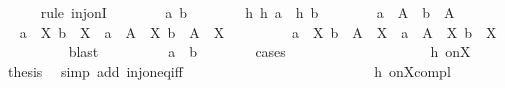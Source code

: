\begin{isabellebody}
\ \ \ \ \isamarkupfalse%
\ {\isacharparenleft}{\kern0pt}rule\ inj{\isacharunderscore}{\kern0pt}onI{\isacharparenright}{\kern0pt}\isanewline
\ \ \ \ \ \ \isamarkupfalse%
\ a\ b\isanewline
\ \ \ \ \ \ \isamarkupfalse%
\ h{\isacharcolon}{\kern0pt}\ {\isachardoublequoteopen}{\isacharquery}{\kern0pt}h\ a\ {\isacharequal}{\kern0pt}\ {\isacharquery}{\kern0pt}h\ b{\isachardoublequoteclose}\isanewline
\ \ \ \ \ \ \isamarkupfalse%
\ {\isachardoublequoteopen}a\ {\isasymin}\ A{\isachardoublequoteclose}\ \ {\isachardoublequoteopen}b\ {\isasymin}\ A{\isachardoublequoteclose}\isanewline
\ \ \ \ \ \ \isamarkupfalse%
\ \isamarkupfalse%
\ {\isachardoublequoteopen}a\ {\isasymin}\ X{\isachardoublequoteclose}\ {\isachardoublequoteopen}b\ {\isasymin}\ X{\isachardoublequoteclose}\ {\isacharbar}{\kern0pt}\ {\isachardoublequoteopen}a\ {\isasymin}\ A\ {\isacharminus}{\kern0pt}\ X{\isachardoublequoteclose}\ {\isachardoublequoteopen}b\ {\isasymin}\ A\ {\isacharminus}{\kern0pt}\ X{\isachardoublequoteclose}\isanewline
\ \ \ \ \ \ \ \ {\isacharbar}{\kern0pt}\ {\isachardoublequoteopen}a\ {\isasymin}\ X{\isachardoublequoteclose}\ {\isachardoublequoteopen}b\ {\isasymin}\ A\ {\isacharminus}{\kern0pt}\ X{\isachardoublequoteclose}\ {\isacharbar}{\kern0pt}\ {\isachardoublequoteopen}a\ {\isasymin}\ A\ {\isacharminus}{\kern0pt}\ X{\isachardoublequoteclose}\ {\isachardoublequoteopen}b\ {\isasymin}\ X{\isachardoublequoteclose}\isanewline
\ \ \ \ \ \ \ \ \isamarkupfalse%
\ blast\isanewline
\ \ \ \ \ \ \isamarkupfalse%
\ \isamarkupfalse%
\ {\isachardoublequoteopen}a\ {\isacharequal}{\kern0pt}\ b{\isachardoublequoteclose}\isanewline
\ \ \ \ \ \ \isamarkupfalse%
\ cases\isanewline
\ \ \ \ \ \ \ \ \isamarkupfalse%
\ {}\isanewline
\ \ \ \ \ \ \ \ \isamarkupfalse%
\ h\ on{\isacharunderscore}{\kern0pt}X\ \isamarkupfalse%
\ {\isacharquery}{\kern0pt}thesis\ \isamarkupfalse%
\ {\isacharparenleft}{\kern0pt}simp\ add{\isacharcolon}{\kern0pt}\ inj{\isacharunderscore}{\kern0pt}on{\isacharunderscore}{\kern0pt}eq{\isacharunderscore}{\kern0pt}iff{\isacharparenright}{\kern0pt}\isanewline
\ \ \ \ \ \ \isamarkupfalse%
\isanewline
\ \ \ \ \ \ \ \ \isamarkupfalse%
\ {}\isanewline
\ \ \ \ \ \ \ \ \isamarkupfalse%
\ h\ on{\isacharunderscore}{\kern0pt}X{\isacharunderscore}{\kern0pt}compl\ \isamarkupfalse%

\end{isabellebody}
